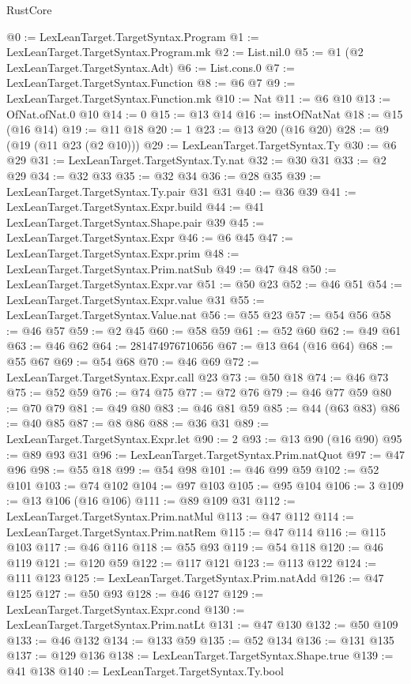 \begin{lexlean}{RustCore}
\begin{coremodule}
@0 := LexLeanTarget.TargetSyntax.Program
@1 := LexLeanTarget.TargetSyntax.Program.mk
@2 := List.nil.{0}
@5 := @1 (@2 LexLeanTarget.TargetSyntax.Adt)
@6 := List.cons.{0}
@7 := LexLeanTarget.TargetSyntax.Function
@8 := @6 @7
@9 := LexLeanTarget.TargetSyntax.Function.mk
@10 := Nat
@11 := @6 @10
@13 := OfNat.ofNat.{0} @10
@14 := 0
@15 := @13 @14
@16 := instOfNatNat
@18 := @15 (@16 @14)
@19 := @11 @18
@20 := 1
@23 := @13 @20 (@16 @20)
@28 := @9 (@19 (@11 @23 (@2 @10)))
@29 := LexLeanTarget.TargetSyntax.Ty
@30 := @6 @29
@31 := LexLeanTarget.TargetSyntax.Ty.nat
@32 := @30 @31
@33 := @2 @29
@34 := @32 @33
@35 := @32 @34
@36 := @28 @35
@39 := LexLeanTarget.TargetSyntax.Ty.pair @31 @31
@40 := @36 @39
@41 := LexLeanTarget.TargetSyntax.Expr.build
@44 := @41 LexLeanTarget.TargetSyntax.Shape.pair @39
@45 := LexLeanTarget.TargetSyntax.Expr
@46 := @6 @45
@47 := LexLeanTarget.TargetSyntax.Expr.prim
@48 := LexLeanTarget.TargetSyntax.Prim.natSub
@49 := @47 @48
@50 := LexLeanTarget.TargetSyntax.Expr.var
@51 := @50 @23
@52 := @46 @51
@54 := LexLeanTarget.TargetSyntax.Expr.value @31
@55 := LexLeanTarget.TargetSyntax.Value.nat
@56 := @55 @23
@57 := @54 @56
@58 := @46 @57
@59 := @2 @45
@60 := @58 @59
@61 := @52 @60
@62 := @49 @61
@63 := @46 @62
@64 := 281474976710656
@67 := @13 @64 (@16 @64)
@68 := @55 @67
@69 := @54 @68
@70 := @46 @69
@72 := LexLeanTarget.TargetSyntax.Expr.call @23
@73 := @50 @18
@74 := @46 @73
@75 := @52 @59
@76 := @74 @75
@77 := @72 @76
@79 := @46 @77 @59
@80 := @70 @79
@81 := @49 @80
@83 := @46 @81 @59
@85 := @44 (@63 @83)
@86 := @40 @85
@87 := @8 @86
@88 := @36 @31
@89 := LexLeanTarget.TargetSyntax.Expr.let
@90 := 2
@93 := @13 @90 (@16 @90)
@95 := @89 @93 @31
@96 := LexLeanTarget.TargetSyntax.Prim.natQuot
@97 := @47 @96
@98 := @55 @18
@99 := @54 @98
@101 := @46 @99 @59
@102 := @52 @101
@103 := @74 @102
@104 := @97 @103
@105 := @95 @104
@106 := 3
@109 := @13 @106 (@16 @106)
@111 := @89 @109 @31
@112 := LexLeanTarget.TargetSyntax.Prim.natMul
@113 := @47 @112
@114 := LexLeanTarget.TargetSyntax.Prim.natRem
@115 := @47 @114
@116 := @115 @103
@117 := @46 @116
@118 := @55 @93
@119 := @54 @118
@120 := @46 @119
@121 := @120 @59
@122 := @117 @121
@123 := @113 @122
@124 := @111 @123
@125 := LexLeanTarget.TargetSyntax.Prim.natAdd
@126 := @47 @125
@127 := @50 @93
@128 := @46 @127
@129 := LexLeanTarget.TargetSyntax.Expr.cond
@130 := LexLeanTarget.TargetSyntax.Prim.natLt
@131 := @47 @130
@132 := @50 @109
@133 := @46 @132
@134 := @133 @59
@135 := @52 @134
@136 := @131 @135
@137 := @129 @136
@138 := LexLeanTarget.TargetSyntax.Shape.true
@139 := @41 @138
@140 := LexLeanTarget.TargetSyntax.Ty.bool

\end{coremodule}
\end{lexlean}
